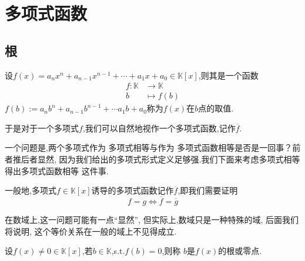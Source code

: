 \section{多项式函数}
\subsection{根}
\begin{formal}
\begin{definition}[多项式函数]\label{def:多项式函数}
    设$f\left(x\right)=a_nx^n+a_{n-1}x^{n-1}+\cdots+a_1x+a_0\in\mathbb{K}\left[x\right]$,则其是一个函数
    \begin{align*}
        f:\mathbb{K}&\longrightarrow \mathbb{K}\\
        b&\longmapsto f\left(b\right)
    \end{align*}
    $f\left(b\right):=
        a_nb^n+a_{n-1}b^{n-1}+\cdots a_1b+a_0$称为$f\left(x\right)$在$b$点的取值.

        于是对于一个多项式$f$,我们可以自然地视作一个多项式函数,记作$\overline{f}$.
\end{definition}
\end{formal}
\begin{red}
\begin{remark}
一个问题是,两个多项式作为
多项式相等与作为
多项式函数相等是否是一回事？前者推后者显然,
因为我们给出的多项式形式定义足够强.我们下面来考虑多项式相等得出多项式函数相等
这件事.
\end{remark}
\end{red}
\begin{red}
\begin{remark}
    一般地,多项式$f\in\mathbb{K}\left[x\right]$诱导的多项式函数记作$\overline{f}$,即我们需要证明
    \[
    f=g\Longleftrightarrow \overline{f}=\overline{g}
    \]
\end{remark}
\end{red}
\begin{red}
\begin{remark}
    在数域上,这一问题可能有一点“显然”,
    但实际上,数域只是一种特殊的域,
    后面我们将说明,
    这个等价关系在一般的域上不见得成立.
\end{remark}
\end{red}
\begin{formal}
\begin{definition}[根的定义]\label{def:根的定义}
    设$f\left(x\right)\neq 0\in\mathbb{K}
    \left[x\right]$,若$b\in\mathbb{K}$,\textup{s.t.}$f\left(b\right)=0$,则称
    $b$是$f\left(x\right)$的根或零点.
\end{definition}
\end{formal}
